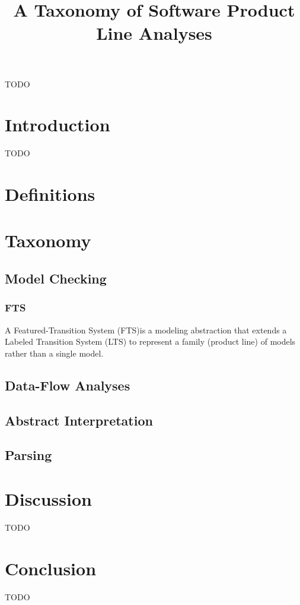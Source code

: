 \documentclass{article}
\newcommand{\Classen}{\cite{Classen:2010:MCL:1806799.1806850}}
\begin{document}
\title{A Taxonomy of Software Product Line Analyses}
\maketitle

\abstract
TODO

\section{Introduction}
TODO

\section{Definitions}

\section{Taxonomy}

\subsection{Model Checking}

\subsubsection{FTS}
A Featured-Transition System (FTS)\Classen is a modeling abstraction that extends a Labeled Transition System (LTS) to represent a family (product line) of models rather than a single model. 
\subsection{Data-Flow Analyses}
\subsection{Abstract Interpretation}
\subsection{Parsing}

\section{Discussion}
TODO

\section{Conclusion}
TODO


 
\end{document}
